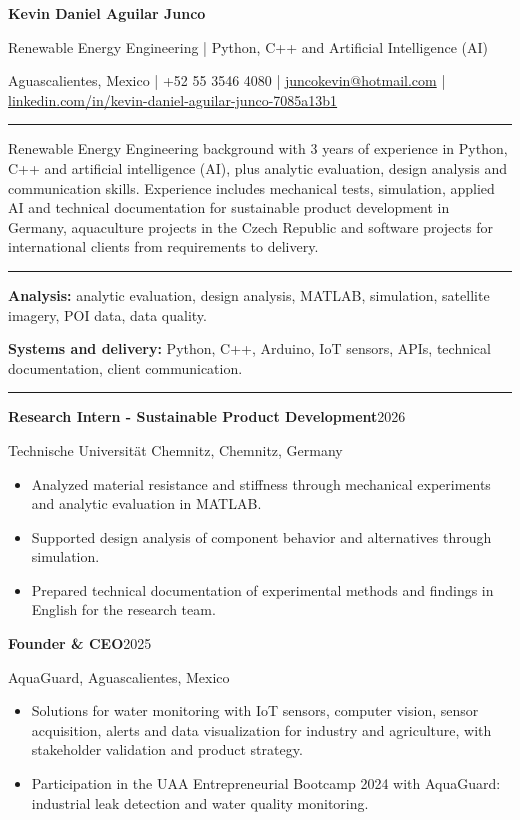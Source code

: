 \documentclass[10pt,a4paper]{article}
\newcommand{\cvsection}[1]{\par\vspace{7pt}{\large\textbf{\MakeUppercase{#1}}}\par\vspace{1pt}\hrule\vspace{4pt}}
\begin{document}
\small
{\LARGE\textbf{Kevin Daniel Aguilar Junco}}\par
\vspace{2pt}
{\large Renewable Energy Engineering | Python, C++ and Artificial Intelligence (AI)}\par
\vspace{2pt}
{\footnotesize Aguascalientes, Mexico | +52 55 3546 4080 | \href{mailto:juncokevin@hotmail.com}{juncokevin@hotmail.com} | \href{https://www.linkedin.com/in/kevin-daniel-aguilar-junco-7085a13b1}{linkedin.com/in/kevin-daniel-aguilar-junco-7085a13b1}}\par
\cvsection{Summary}
Renewable Energy Engineering background with 3 years of experience in Python, C++ and artificial intelligence (AI), plus analytic evaluation, design analysis and communication skills. Experience includes mechanical tests, simulation, applied AI and technical documentation for sustainable product development in Germany, aquaculture projects in the Czech Republic and software projects for international clients from requirements to delivery.\par
\cvsection{Skills}
\textbf{Analysis:} analytic evaluation, design analysis, MATLAB, simulation, satellite imagery, POI data, data quality.\par
\textbf{Systems and delivery:} Python, C++, Arduino, IoT sensors, APIs, technical documentation, client communication.\par
\cvsection{Professional experience}
\textbf{Research Intern - Sustainable Product Development}\hfill 2026\par
Technische Universität Chemnitz, Chemnitz, Germany\par
\begin{itemize}
\item Analyzed material resistance and stiffness through mechanical experiments and analytic evaluation in MATLAB.
\item Supported design analysis of component behavior and alternatives through simulation.
\item Prepared technical documentation of experimental methods and findings in English for the research team.
\end{itemize}
\textbf{Founder \& CEO}\hfill 2025\par
AquaGuard, Aguascalientes, Mexico\par
\begin{itemize}
\item Solutions for water monitoring with IoT sensors, computer vision, sensor acquisition, alerts and data visualization for industry and agriculture, with stakeholder validation and product strategy.
\item Participation in the UAA Entrepreneurial Bootcamp 2024 with AquaGuard: industrial leak detection and water quality monitoring.
\end{itemize}
\end{document}
